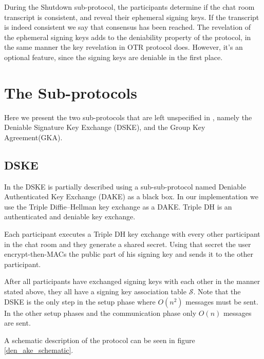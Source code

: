 \documentclass[]{article}
\begin{document}
During the Shutdown sub-protocol, the participants determine if the chat room transcript is consistent, and reveal their ephemeral signing keys.
If the transcript is indeed consistent we say that consensus has been reached.
The revelation of the ephemeral signing keys adds to the deniability property of the protocol, in the same manner the key revelation in OTR protocol does.
However, it's an optional feature, since the signing keys are deniable in the first place.

\section{The Sub-protocols}
\label{subprots}

Here we present the two sub-protocols that are left unspecified in \cite{mpotr}, namely the Deniable Signature Key Exchange (DSKE), and the Group Key Agreement(GKA).

\subsection{DSKE}
\label{dske_subprot}

In \cite{mpotr} the DSKE is partially described using a sub-sub-protocol named Deniable Authenticated Key Exchange (DAKE) as a black box.
In our implementation we use the Triple Diffie--Hellman key exchange as a DAKE.
Triple DH is an authenticated and deniable key exchange.

Each participant executes a Triple DH key exchange with every other participant in the chat room and they generate a shared secret.
Using that secret the user encrypt-then-MACs the public part of his signing key and sends it to the other participant.

After all participants have exchanged signing keys with each other in the manner stated above, they all have a signing key association table $\mathcal{S}$.
Note that the DSKE is the only step in the setup phase where $O(n^2)$ messages must be sent.
In the other setup phases and the communication phase only $O(n)$ messages are sent.

A schematic description of the protocol can be seen in figure \ref{den_ake_schematic}.
\end{document}
